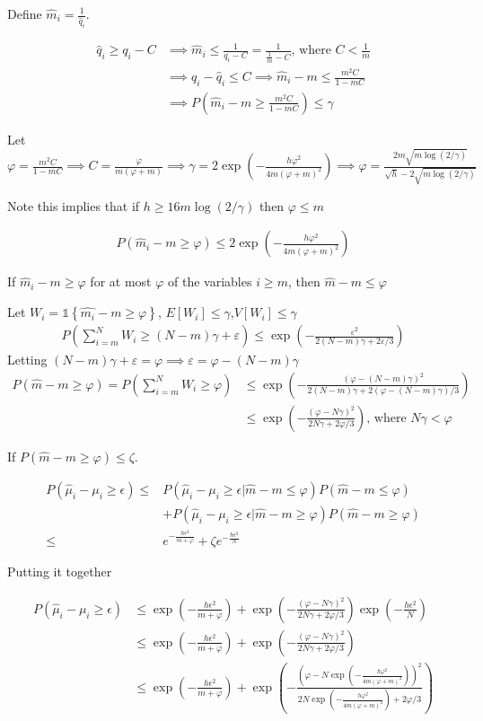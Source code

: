 \documentclass{article}
\newcommand{\set}[1]{\left\{#1\right\}}
\newcommand{\ind}[1]{\mathds{1}\!\!\set{#1}}
\newcommand{\eqn}[1]{\begin{align}#1\end{align}}
\theoremstyle{plain}
\theoremstyle{definition}
\begin{document}
Define $\hat{m}_i = \frac{1}{\hat{q}_i}$.

\eqn{
\hat{q}_i \geq q_i - C & \implies \hat{m}_i \leq \frac{1}{q_i-C} = \frac{1}{\frac{1}{m} - C} \text{, where } C < \frac{1}{m} \\
& \implies q_i - \hat{q}_i \leq C \implies \hat{m}_i - m \leq \frac{m^2C}{1-mC}\\
& \implies P(\hat{m}_i - m \geq \frac{m^2C}{1-mC}) \leq \gamma
}

Let $\varphi = \frac{m^2C}{1-mC} \implies C = \frac{\varphi}{m(\varphi+m)} \implies \gamma = 2\exp(-\frac{h \varphi^2}{4m(\varphi+m)^2}) \implies \varphi = \frac{2m\sqrt{m\log(2/\gamma)}}{\sqrt{h}-2\sqrt{m \log(2/\gamma)}} $

Note this implies that if $h \geq 16m\log(2/\gamma)$ then $\varphi \leq m$

\eqn {
P(\hat{m}_i - m \geq \varphi) \leq 2\exp(-\frac{h \varphi^2}{4m(\varphi+m)^2})
}


If $\hat{m}_i - m \geq \varphi$ for at most $\varphi$ of the variables $i \geq m$, then $\hat{m} - m \leq \varphi$

Let $W_i = \ind{\hat{m_i}-m \geq \varphi}$, $E[W_i] \leq \gamma$,$V[W_i] \leq \gamma$ 
\eqn{
P(\sum_{i=m}^N W_i \geq (N-m)\gamma + \varepsilon) \leq \exp(-\frac{\varepsilon^2}{2(N-m)\gamma+2\varepsilon/3})
}
Letting $(N-m)\gamma + \varepsilon = \varphi \implies \varepsilon = \varphi - (N-m)\gamma$
\eqn{
P(\hat{m}-m \geq \varphi) =  P(\sum_{i=m}^N W_i \geq \varphi) &\leq \exp({-\frac{(\varphi-(N-m)\gamma)^2}{2(N-m)\gamma + 2(\varphi-(N-m)\gamma)/3}})\\
& \leq \exp({-\frac{(\varphi-N\gamma)^2}{2N\gamma + 2\varphi/3}}) \text{, where } N\gamma < \varphi
} 



If $P(\hat{m}-m \geq \varphi) \leq \zeta$. 


\eqn{
P(\hat{\mu}_i-\mu_i \geq \epsilon) \leq & P(\hat{\mu}_i-\mu_i \geq \epsilon |\hat{m}-m \leq \varphi )P(\hat{m}-m \leq \varphi) \\
& + P(\hat{\mu}_i-\mu_i \geq \epsilon |\hat{m}-m \geq \varphi)P(\hat{m}-m \geq \varphi)\\  \leq & e^{-\frac{h\epsilon^2}{m+\varphi}} + \zeta e^{-\frac{h \epsilon^2}{N}}
}

Putting it together 

\eqn {
P(\hat{\mu}_i-\mu_i \geq \epsilon)& \leq \exp({-\frac{h\epsilon^2}{m+\varphi}}) + \exp({-\frac{(\varphi-N\gamma)^2}{2N\gamma + 2\varphi/3}}) \exp({-\frac{h \epsilon^2}{N}})\\
& \leq \exp({-\frac{h\epsilon^2}{m+\varphi}}) + \exp({-\frac{(\varphi-N\gamma)^2}{2N\gamma + 2\varphi/3}}) \\
& \leq \exp({-\frac{h\epsilon^2}{m+\varphi}}) + \exp({-\frac{(\varphi-N\exp(-\frac{h\varphi^2}{4m(\varphi+m)^2}))^2}{2N\exp(-\frac{h\varphi^2}{4m(\varphi+m)^2}) + 2\varphi/3}})
}
\end{document}
